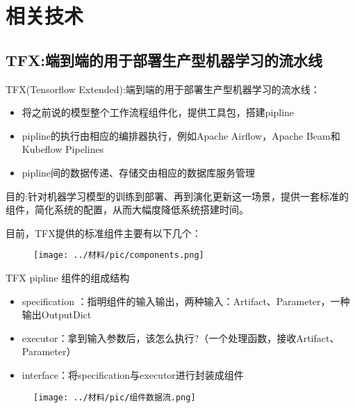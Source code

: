 \documentclass[notheorems, aspectratio=1610]{beamer}
\begin{document}
\section{相关技术}
\subsection{TFX:端到端的用于部署生产型机器学习的流水线}
\begin{frame}
    \large TFX(Tensorflow Extended):端到端的用于部署生产型机器学习的流水线：
    \begin{itemize}
        \item 将之前说的模型整个工作流程组件化，提供工具包，搭建pipline
        \item pipline的执行由相应的编排器执行，例如Apache Airflow，Apache Beam和Kubeflow Pipelines
        \item pipline间的数据传递、存储交由相应的数据库服务管理
    \end{itemize} 
    \par 目的:针对机器学习模型的训练到部署、再到演化更新这一场景，提供一套标准的组件，简化系统的配置，从而大幅度降低系统搭建时间。
\end{frame}

\begin{frame}
    \large 目前，TFX提供的标准组件主要有以下几个：
    \begin{figure}[h] %
        \centering
        \texttt{[image: ../材料/pic/components.png]} %
    \end{figure}%

\end{frame}

\begin{frame}
    \large TFX pipline 组件的组成结构
    \begin{itemize}
        \item specification ：指明组件的输入输出，两种输入：Artifact、Parameter，一种输出OutputDict
        \item executor：拿到输入参数后，该怎么执行?（一个处理函数，接收Artifact、Parameter）
        \item interface：将specification与executor进行封装成组件
    \end{itemize}
    \begin{figure}[h] %
    \centering %
    \texttt{[image: ../材料/pic/组件数据流.png]} %
    \end{figure}%
\end{frame}
\end{document}
